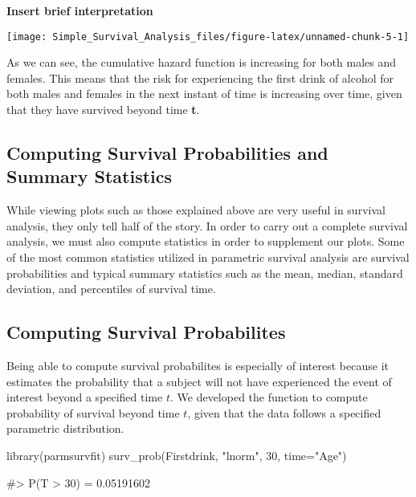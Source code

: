 \textbf{Insert brief interpretation}

\begin{Schunk}

\texttt{[image: Simple\_Survival\_Analysis\_files/figure-latex/unnamed-chunk-5-1]} \end{Schunk}

As we can see, the cumulative hazard function is increasing for both
males and females. This means that the risk for experiencing the first
drink of alcohol for both males and females in the next instant of time
is increasing over time, given that they have survived beyond time
\textbf{t}.

\hypertarget{computing-survival-probabilities-and-summary-statistics}{%
\subsection{Computing Survival Probabilities and Summary
Statistics}\label{computing-survival-probabilities-and-summary-statistics}}

While viewing plots such as those explained above are very useful in
survival analysis, they only tell half of the story. In order to carry
out a complete survival analysis, we must also compute statistics in
order to supplement our plots. Some of the most common statistics
utilized in parametric survival analysis are survival probabilities and
typical summary statistics such as the mean, median, standard deviation,
and percentiles of survival time.

\hypertarget{computing-survival-probabilites}{%
\subsection{Computing Survival
Probabilites}\label{computing-survival-probabilites}}

Being able to compute survival probabilites is especially of interest
because it estimates the probability that a subject will not have
experienced the event of interest beyond a specified time \(t\). We
developed the function  to compute probability of
survival beyond time \(t\), given that the data follows a specified
parametric distribution.

\begin{Schunk}
\begin{Sinput}
library(parmsurvfit)
surv_prob(Firstdrink, "lnorm", 30, time="Age")
\end{Sinput}
\begin{Soutput}
#> P(T > 30) = 0.05191602
\end{Soutput}
\end{Schunk}

